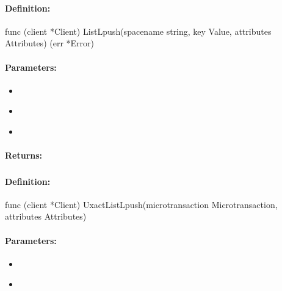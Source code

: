 \paragraph{Definition:}
\begin{gocode}
func (client *Client) ListLpush(spacename string, key Value, attributes Attributes) (err *Error)
\end{gocode}

\paragraph{Parameters:}
\begin{itemize}[noitemsep]
\item {}\\

\item {}\\

\item {}\\

\end{itemize}

\paragraph{Returns:}


\pagebreak
\subsubsection{}
\label{api:Go:UxactListLpush}


\paragraph{Definition:}
\begin{gocode}
func (client *Client) UxactListLpush(microtransaction Microtransaction, attributes Attributes)
\end{gocode}

\paragraph{Parameters:}
\begin{itemize}[noitemsep]
\item {}\\

\item {}\\

\end{itemize}

